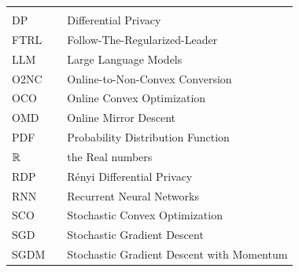 \begin{center}
  \begin{tabular}{lll}
    \hspace*{2em} & \hspace*{1in} & \hspace*{4.5in} \\
    DP   & \dotfill & Differential Privacy \\
    FTRL & \dotfill & Follow-The-Regularized-Leader \\
    LLM  & \dotfill & Large Language Models \\
    O2NC & \dotfill & Online-to-Non-Convex Conversion \\
    OCO  & \dotfill & Online Convex Optimization \\
    OMD  & \dotfill & Online Mirror Descent \\
    PDF  & \dotfill & Probability Distribution Function \\
    $\mathbb R$  & \dotfill & the Real numbers \\
    RDP  & \dotfill & R\'enyi Differential Privacy \\
    RNN  & \dotfill & Recurrent Neural Networks \\
    SCO  & \dotfill & Stochastic Convex Optimization \\
    SGD  & \dotfill & Stochastic Gradient Descent \\
    SGDM & \dotfill & Stochastic Gradient Descent with Momentum \\
  \end{tabular}
\end{center}
\cleardoublepage


\newpage
\endofprelim

